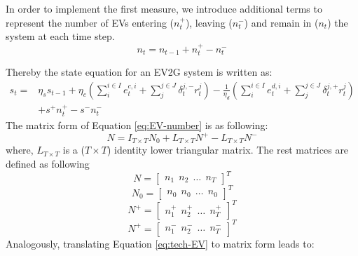 In order to implement the first measure, we introduce additional terms to represent the number of EVs entering ($n_t^+$), leaving ($n_t^-$) and remain in ($n_t$) the system at each time step. 
\begin{equation}
\label{eq:EV-number}
n_t = n_{t-1} + n_t^+ - n_t^-
\end{equation}

Thereby the state equation for an EV2G system is written as:
\begin{equation}
\label{eq:tech-EV}
\begin{aligned}
s_t = & \eta_s s_{t-1} + \eta_c (\sum_{i}^{i \in I} e_t^{c,i} + \sum_{j}^{j \in J}\delta_t^{j,-}r_t^j)- \frac{1}{\eta_d} (\sum_{i}^{i \in I} e_t^{d,i} + \sum_{j}^{j \in J}\delta_t^{j,+}r_t^j) \\
&+ s^+ n_t^+ - s^- n_t^-
\end{aligned}
\end{equation} 
\newline
The matrix form of Equation \eqref{eq:EV-number} is as following:
\begin{equation}
\label{eq:EV-number-M}
N = I_{T \times T} N_0 + L_{T \times T} N^+ -L_{T \times T} N^- 
\end{equation}
where, $L_{T \times T}$ is a ($T \times T$) identity lower triangular matrix. The rest matrices are defined as following
\begin{equation*}
N = \begin{bmatrix}
n_1~~n_2~~\dots~~n_T
\end{bmatrix}^T
\end{equation*}
\begin{equation*}
N_0 = \begin{bmatrix}
n_0~~n_0~~\dots~~n_0
\end{bmatrix}^T
\end{equation*}
\begin{equation*}
N^+ = \begin{bmatrix}
n_1^+~~n_2^+~~\dots~~n_T^+
\end{bmatrix}^T
\end{equation*}
\begin{equation*}
N^+ = \begin{bmatrix}
n_1^-~~n_2^-~~\dots~~n_T^-
\end{bmatrix}^T
\end{equation*}
\newline
Analogously, translating Equation \eqref{eq:tech-EV} to matrix form leads to:

